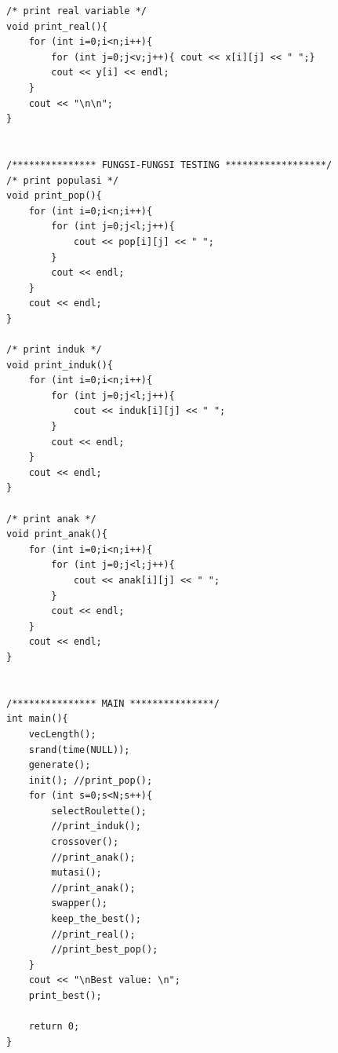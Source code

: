 \documentclass[paper=a4, fontsize=11pt]{scrartcl}
\numberwithin{equation}{section} %
\numberwithin{figure}{section} %
\numberwithin{table}{section} %
\begin{document}
\begin{lstlisting}
/* print real variable */
void print_real(){
    for (int i=0;i<n;i++){
        for (int j=0;j<v;j++){ cout << x[i][j] << " ";}
        cout << y[i] << endl;
    }
    cout << "\n\n";
}


/*************** FUNGSI-FUNGSI TESTING ******************/
/* print populasi */
void print_pop(){
    for (int i=0;i<n;i++){
        for (int j=0;j<l;j++){
            cout << pop[i][j] << " ";
        }
        cout << endl;
    }
    cout << endl;
}

/* print induk */
void print_induk(){
    for (int i=0;i<n;i++){
        for (int j=0;j<l;j++){
            cout << induk[i][j] << " ";
        }
        cout << endl;
    }
    cout << endl;
}

/* print anak */
void print_anak(){
    for (int i=0;i<n;i++){
        for (int j=0;j<l;j++){
            cout << anak[i][j] << " ";
        }
        cout << endl;
    }
    cout << endl;
}


/*************** MAIN ***************/
int main(){
    vecLength();
    srand(time(NULL));
    generate();
    init(); //print_pop();
    for (int s=0;s<N;s++){
        selectRoulette();
        //print_induk();  
        crossover();
        //print_anak();
        mutasi();
        //print_anak();
        swapper();
        keep_the_best();
        //print_real();
        //print_best_pop();
    }
    cout << "\nBest value: \n";
    print_best();
     
    return 0;
}
\end{lstlisting}
\end{document}
